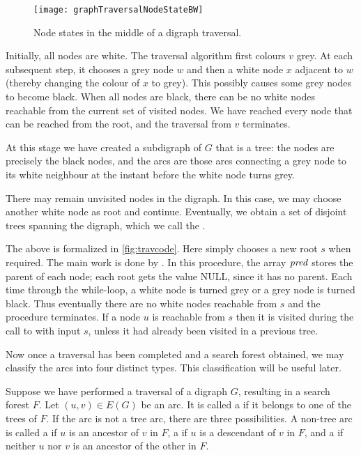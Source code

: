 \begin{figure}
  \centering
  \texttt{[image: graphTraversalNodeStateBW]}
  \caption{Node states in the middle of a digraph traversal.}
  \label{fig:travcols}
\end{figure}

Initially, all nodes are white. The traversal algorithm first colours
$v$ grey. At each subsequent step, it chooses a grey node $w$ and then a
white node $x$ adjacent to $w$ (thereby changing the colour of $x$ to
grey). This possibly causes some grey nodes to become black. When all
nodes are black, there can be no white nodes reachable from the current
set of visited nodes. We have reached every node that can be reached
from the root, and the traversal from $v$ terminates. 

At this stage we have created a subdigraph of $G$ that is a tree: the
nodes are precisely the black nodes, and the arcs are those arcs
connecting a grey node to its white neighbour at the instant before the
white node turns grey.

There may remain unvisited nodes in the digraph. In this case, we may
choose another white node as root and continue. Eventually, we obtain a
set of disjoint trees spanning the digraph, which we call the
. 

The above is formalized in \cref{fig:travcode}. Here
 simply chooses a new root $s$ when required. The main
work is done by . In this procedure, the array $\operatorname{\text{\textit{pred}}}$
stores the parent of each node; each root gets the value NULL, since it
has no parent. Each time through the while-loop, a white node is turned
grey or a grey node is turned black. Thus eventually there are no white
nodes reachable from $s$ and the procedure terminates. If a node $u$ is
reachable from $s$ then it is visited during the call to 
with input $s$, unless it had already been visited in a previous tree.

Now once a traversal has been completed and a search forest obtained,
we may classify the arcs into four distinct types. This classification
will be  useful later.

\begin{Definition}\label{defn:arc-types}
Suppose we have performed a traversal of a digraph $G$, resulting in a
search forest $F$.  Let $(u, v)\in E(G)$ be an arc. It is called a
 if it belongs to one of the trees of $F$. If the arc
is not a tree arc, there are three possibilities.  A non-tree arc is
called a  if $u$ is an ancestor of $v$ in $F$, a
 if $u$ is a descendant of $v$ in $F$, and a
 if neither $u$ nor $v$ is an ancestor of the other in $F$.
\end{Definition} 

